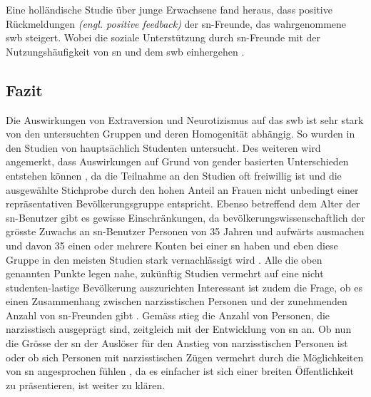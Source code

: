 Eine holländische Studie über junge Erwachsene fand heraus, dass positive Rückmeldungen \textit{(engl. positive feedback)} der \gls{sn}-Freunde, das wahrgenommene \gls{swb} steigert. Wobei die soziale Unterstützung durch \gls{sn}-Freunde mit der Nutzungshäufigkeit von \gls{sn} und dem \gls{swb} einhergehen \cite{Valkenburg:2006}. 

\subsection{Fazit}\label{subsec.traitsFazit}
Die Auswirkungen von Extraversion und Neurotizismus auf das \gls{swb} ist sehr stark von den untersuchten Gruppen und deren Homogenität abhängig. So wurden in den Studien von  hauptsächlich Studenten untersucht. Des weiteren wird angemerkt, dass Auswirkungen auf Grund von gender basierten Unterschieden entstehen können \cite{Special:2012}, da die Teilnahme an den Studien oft freiwillig ist und die ausgewählte Stichprobe durch den hohen Anteil an Frauen \cite{Manago:2012} nicht unbedingt einer repräsentativen Bevölkerungsgruppe entspricht. Ebenso betreffend dem Alter der \gls{sn}-Benutzer gibt es gewisse Einschränkungen, da bevölkerungswissenschaftlich der grösste Zuwachs an \gls{sn}-Benutzer Personen von 35 Jahren und aufwärts ausmachen \cite{Lenhart:2009} und davon 35\text{\%}  einen oder mehrere Konten bei einer \gls{sn} haben und eben diese Gruppe in den meisten Studien stark vernachlässigt wird \cite{Special:2012}. Alle die oben genannten Punkte legen nahe, zukünftig Studien vermehrt auf eine nicht studenten-lastige Bevölkerung auszurichten \cite{Kim:2011} \newline
Interessant ist zudem die Frage, ob es einen Zusammenhang zwischen narzisstischen Personen und der zunehmenden Anzahl von \gls{sn}-Freunden gibt \cite{Manago:2012}. Gemäss  stieg die Anzahl von Personen, die narzisstisch ausgeprägt sind, zeitgleich mit der Entwicklung von \gls{sn} an. Ob nun die Grösse der \gls{sn} der Auslöser für den Anstieg von narzisstischen Personen ist \cite{Manago:2012} oder ob sich Personen mit narzisstischen Zügen vermehrt durch die Möglichkeiten von \gls{sn} angesprochen fühlen \cite{Carpenter:2012}, da es einfacher ist sich einer breiten Öffentlichkeit zu präsentieren, ist weiter zu klären. 








